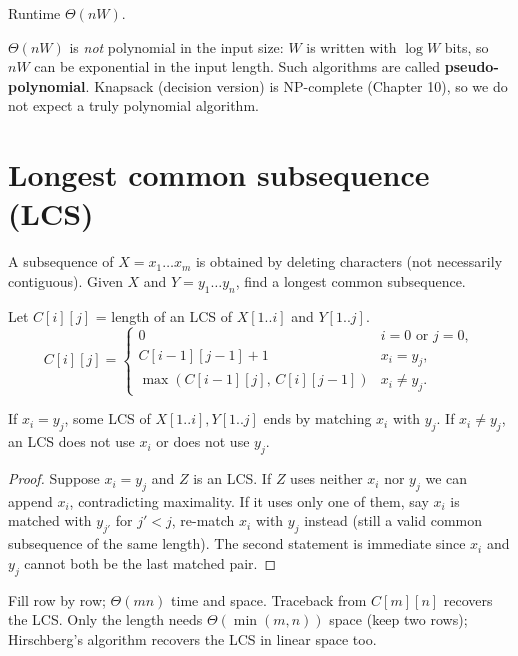 \begin{center}
\end{center}
Runtime $\Theta(nW)$.

\begin{important}
$\Theta(nW)$ is \emph{not} polynomial in the input size: $W$ is written with $\log W$ bits, so $nW$ can be exponential in the
input length. Such algorithms are called \textbf{pseudo-polynomial}. Knapsack (decision version) is NP-complete (Chapter 10),
so we do not expect a truly polynomial algorithm.
\end{important}

\section{Longest common subsequence (LCS)}
A subsequence of $X=x_1\dots x_m$ is obtained by deleting characters (not necessarily contiguous).
Given $X$ and $Y=y_1\dots y_n$, find a longest common subsequence.

Let $C[i][j]$ = length of an LCS of $X[1..i]$ and $Y[1..j]$.
\[
C[i][j]=\begin{cases}
0 & i=0\text{ or }j=0,\\
C[i-1][j-1]+1 & x_i=y_j,\\
\max(C[i-1][j],\,C[i][j-1]) & x_i\ne y_j.
\end{cases}
\]
\begin{lemma}
If $x_i=y_j$, some LCS of $X[1..i],Y[1..j]$ ends by matching $x_i$ with $y_j$.
If $x_i\ne y_j$, an LCS does not use $x_i$ or does not use $y_j$.
\end{lemma}
\begin{proof}
Suppose $x_i=y_j$ and $Z$ is an LCS. If $Z$ uses neither $x_i$ nor $y_j$ we can append $x_i$, contradicting maximality.
If it uses only one of them, say $x_i$ is matched with $y_{j'}$ for $j'<j$, re-match $x_i$ with $y_j$ instead (still a valid common
subsequence of the same length). The second statement is immediate since $x_i$ and $y_j$ cannot both be the last matched pair.
\end{proof}
Fill row by row; $\Theta(mn)$ time and space. Traceback from $C[m][n]$ recovers the LCS.
Only the length needs $\Theta(\min(m,n))$ space (keep two rows); Hirschberg's algorithm recovers the LCS in linear space too.

